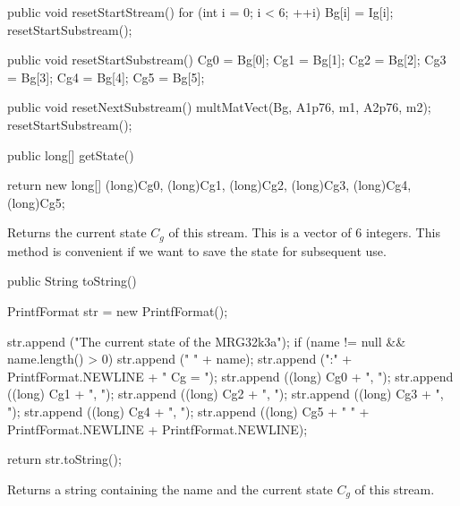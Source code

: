 \begin{code}
\begin{hide}
   public void resetStartStream()  {
      for (int i = 0; i < 6;  ++i)
         Bg[i] = Ig[i];
      resetStartSubstream();
   }

   public void resetStartSubstream()  {
      Cg0 = Bg[0];
      Cg1 = Bg[1];
      Cg2 = Bg[2];
      Cg3 = Bg[3];
      Cg4 = Bg[4];
      Cg5 = Bg[5];
   }

   public void resetNextSubstream()  {
      multMatVect(Bg, A1p76, m1, A2p76, m2);
      resetStartSubstream();
   }

\end{hide}
   public long[] getState() \begin{hide} {
      return new long[] {(long)Cg0, (long)Cg1, (long)Cg2,
                         (long)Cg3, (long)Cg4, (long)Cg5};
   } \end{hide}
\end{code}
 \begin{tabb} Returns the current state $C_g$ of this stream.
  This is a vector of 6 integers. %
  This method is convenient if we want to save the state for
  subsequent use.
 \end{tabb}
\begin{htmlonly}
\end{htmlonly}
\begin{code}

   public String toString() \begin{hide} {
      PrintfFormat str = new PrintfFormat();

      str.append ("The current state of the MRG32k3a");
      if (name != null && name.length() > 0)
         str.append (" " + name);
      str.append (":" + PrintfFormat.NEWLINE + "   Cg = { ");
      str.append ((long) Cg0 + ", ");
      str.append ((long) Cg1 + ", ");
      str.append ((long) Cg2 + ", ");
      str.append ((long) Cg3 + ", ");
      str.append ((long) Cg4 + ", ");
      str.append ((long) Cg5 + " }" + PrintfFormat.NEWLINE +
          PrintfFormat.NEWLINE);

      return str.toString();
   }\end{hide}
\end{code}
 \begin{tabb} Returns a string containing the name and the current state $C_g$
   of this stream.
 \end{tabb}
\begin{htmlonly}
\end{htmlonly}

